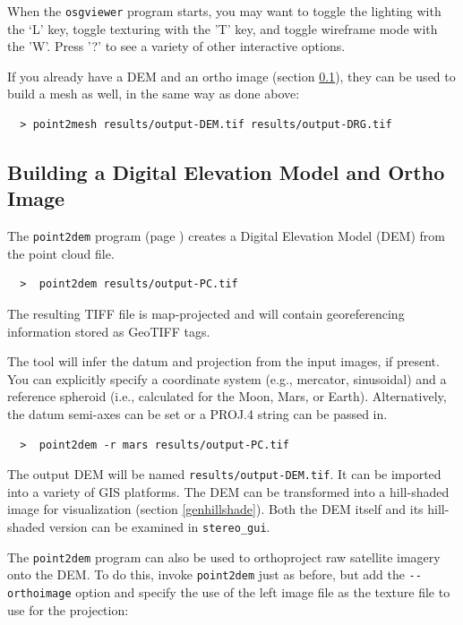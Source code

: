 When the \texttt{osgviewer} program starts, you may want to toggle the
lighting with the `L' key, toggle texturing with the 'T' key, and
toggle wireframe mode with the 'W'.  Press '?' to see a variety of
other interactive options.

If you already have a DEM and an ortho image (section \ref{builddem}),
they can be used to build a mesh as well, in the same way as done above:
\begin{verbatim}
  > point2mesh results/output-DEM.tif results/output-DRG.tif
\end{verbatim}

\subsection{Building a Digital Elevation Model and Ortho Image}
\label{builddem}

The \texttt{point2dem} program (page \pageref{point2dem}) creates a
Digital Elevation Model (\ac{DEM}) from the point cloud file.

\begin{verbatim}
  >  point2dem results/output-PC.tif
\end{verbatim}

The resulting TIFF file is map-projected and will contain
georeferencing information stored as GeoTIFF tags.

The tool will infer the datum and projection from the input images, if
present. You can explicitly specify a coordinate system (e.g.,
mercator, sinusoidal) and a reference spheroid (i.e., calculated for the
Moon, Mars, or Earth). Alternatively, the datum semi-axes can be set or
a PROJ.4 string can be passed in.

\begin{verbatim}
  >  point2dem -r mars results/output-PC.tif
\end{verbatim}

The output DEM will be named \texttt{results/output-DEM.tif}.
It can be imported into a variety of GIS platforms.
The DEM can be transformed into a hill-shaded image for visualization
(section \ref{genhillshade}). Both the DEM itself and its hill-shaded
version can be examined in \texttt{stereo\_gui}.

The \texttt{point2dem} program can also be used to orthoproject raw
satellite imagery onto the \ac{DEM}. To do this, invoke
\texttt{point2dem} just as before, but add the \texttt{-\/-orthoimage}
option and specify the use of the left image file as the texture file
to use for the projection:

